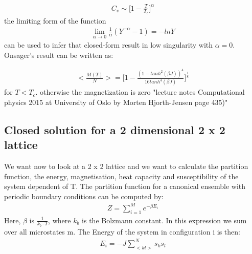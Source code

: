 \documentclass[10pt,a4paper]{article}
\begin{document}
\begin{align}
C_v \sim \Bigg[ 1- \frac{T}{T_c}\Bigg]^{\alpha}
\end{align}
the limiting form of the function
\begin{align}
\lim_{\alpha \to 0} \frac{1}{\alpha}(Y^{-\alpha}-1)=-lnY
\end{align}
can be used to infer that closed-form result in low singularity with $\alpha = 0.$
Onsager's result can be written as:

\begin{align}
<\frac{M(T)}{N}> = \Bigg[ 1- \frac{(1 - tanh ^2(\beta J))^{4}}{16tanh^{4}(\beta J)} \Bigg] ^{\frac{1}{8}} 
\end{align}
for $T<T_c.$ otherwise the magnetization is zero 
"lecture notes Computational physics 2015 at University of Oslo by Morten Hjorth-Jensen page 435)" 


\subsection{Closed solution for a 2 dimensional 2 x 2 lattice}

We want now to look at a 2 x 2 lattice and we want to calculate the partition function, the energy, magnetisation, heat capacity and susceptibility of the system  dependent of T. 
The partition function for a canonical ensemble with periodic boundary conditions can be computed  by:
\begin{align}
Z= \sum_{i=1}^{M} e^{- \beta E_i}
\end{align} 
Here, $\beta$ is $\frac{1}{k_b \cdot T}$, where $k_b$ is the Bolzmann constant. 
In this expression we sum over all microstates m. The Energy of the system in configuration i is then:
\begin{align}
E_i = - J \sum_{<kl>}^N s_k s_l 
\end{align} 
\end{document}
